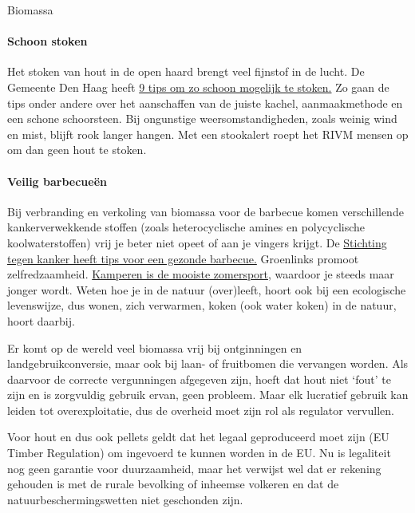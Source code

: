 \begin{voorstel}{Biomassa}
\begin{overwegingen}
\paragraph{Schoon stoken}
Het stoken van hout in de open haard brengt veel fijnstof in de lucht. De Gemeente Den Haag heeft \href{https://www.denhaag.nl/nl/in-de-stad/natuur-en-milieu/duurzaamheid/verstandig-hout-stoken.htm}{9 tips om zo schoon mogelijk te stoken.} Zo gaan de tips onder andere over het aanschaffen van de juiste kachel, aanmaakmethode en een schone schoorsteen. Bij ongunstige weersomstandigheden, zoals weinig wind en mist, blijft rook langer hangen. Met een stookalert roept het RIVM mensen op om dan geen hout te stoken.

\paragraph{Veilig barbecueën}
Bij verbranding en verkoling van biomassa voor de barbecue komen verschillende kankerverwekkende stoffen (zoals heterocyclische amines en polycyclische koolwaterstoffen) vrij je beter niet opeet of aan je vingers krijgt. De \href{https://www.kanker.be/alles-over-kanker/aantoonbaar-risico/tips-om-gezonder-te-barbecue-n}{Stichting tegen kanker heeft tips voor een gezonde barbecue.} Groenlinks promoot zelfredzaamheid. \href{https://www.kanker.be/alles-over-kanker/aantoonbaar-risico/tips-om-gezonder-te-barbecue-n}{Kamperen is de mooiste zomersport,} waardoor je steeds maar jonger wordt. Weten hoe je in de natuur (over)leeft, hoort ook bij een ecologische levenswijze, dus wonen, zich verwarmen, koken (ook water koken) in de natuur, hoort daarbij.

\end{overwegingen}

\begin{aanbevelingen}
Er komt op de wereld veel biomassa vrij bij ontginningen en landgebruikconversie, maar ook bij laan- of fruitbomen die vervangen worden. Als daarvoor de correcte vergunningen afgegeven zijn, hoeft dat hout niet ‘fout’ te zijn en is zorgvuldig gebruik ervan, geen probleem. Maar elk lucratief gebruik kan leiden tot overexploitatie, dus de overheid moet zijn rol als regulator vervullen.

Voor hout en dus ook pellets geldt dat  het legaal geproduceerd moet zijn (EU Timber Regulation) om ingevoerd te kunnen worden in de EU. Nu is legaliteit nog geen garantie voor duurzaamheid, maar het verwijst wel dat er rekening gehouden is met de rurale bevolking of inheemse volkeren en dat de natuurbeschermingswetten niet geschonden zijn.


\end{aanbevelingen}
\end{voorstel}
